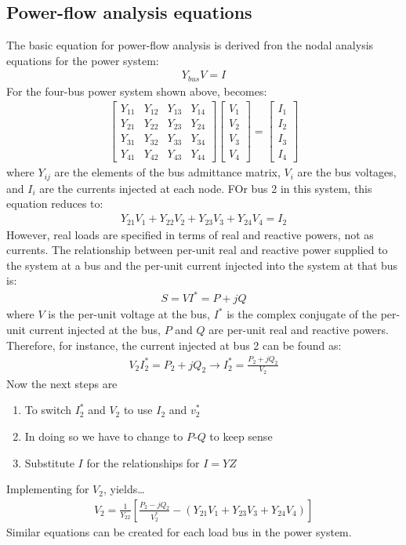 \subsection{Power-flow analysis equations}
The basic equation for power-flow analysis is derived fron the nodal analysis equations for the power system: 
\begin{gather}
	Y_{bus}V = I
\end{gather}
For the four-bus power system shown above, becomes:
\begin{gather}
	\begin{bmatrix}
		Y_{11} & Y_{12} & Y_{13} & Y_{14}\\
		Y_{21} & Y_{22} & Y_{23} & Y_{24}\\
		Y_{31} & Y_{32} & Y_{33} & Y_{34}\\
		Y_{41} & Y_{42} & Y_{43} & Y_{44}
	\end{bmatrix} \begin{bmatrix}
		V_1\\
		V_2\\
		V_3\\
		V_4
	\end{bmatrix}=\begin{bmatrix}
		I_1\\
		I_2\\
		I_3\\
		I_4
	\end{bmatrix}
\end{gather}
where $Y_{ij}$ are the elements of the bus admittance matrix, $V_i$ are the bus voltages, and $I_i$ are the currents injected at each node. FOr bus 2 in this system, this equation reduces to:
\begin{gather}
	Y_{21}V_1 + Y_{22}V_2 + Y_{23}V_3 + Y_{24}V_4 = I_2
\end{gather}
However, real loads are specified in terms of real and reactive powers, not as currents. The relationship between per-unit real and reactive power supplied to the system at a bus and the per-unit current injected into the system at that bus is:
\begin{gather}
	S = VI^* = P+jQ
\end{gather}
where $V$ is the per-unit voltage at the bus, $I^*$ is the complex conjugate of the per-unit current injected at the bus, $P$ and $Q$ are per-unit real and reactive powers. Therefore, for instance, the current injected at bus 2 can be found as:
\begin{gather}
	V_2 I^*_2 = P_2 + jQ_2 \rightarrow I^*_2 = \frac{P_2 + jQ_2}{V_2}
\end{gather}
Now the next steps are
\begin{enumerate}
	\item To switch $I^*_2$ and $V_2$ to use $I_2$ and $v_2^*$
	\item In doing so we have to change to $P$-$Q$ to keep sense
	\item Substitute $I$ for the relationships for $I = YZ$
\end{enumerate}
Implementing for $V_2$, yields\dots
\begin{gather}
	V_2 = \frac{1}{Y_{22}}\left[\frac{P_2-jQ_2}{V_2^*}-\left(Y_{21}V_1+Y_{23}V_3+Y_{24}V_4\right)\right]
\end{gather}
Similar equations can be created for each load bus in the power system.
